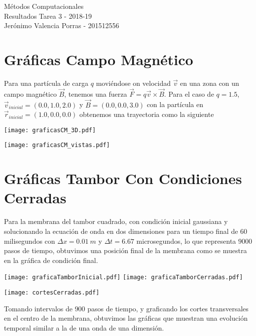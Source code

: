 \documentclass[12pt, letterpaper]{article}
\begin{document}
\begin{center}
{\Large Métodos Computacionales} \\
Resultados Tarea 3 - \textsc{2018-19}\\
Jer\'onimo Valencia Porras - 201512556\\
\end{center}


\noindent
\section{Gr\'aficas Campo Magn\'etico}

Para una partícula de carga $q$ moviéndose on velocidad $\vec{v}$ en una zona con un campo magnético $\vec{B}$, tenemos una fuerza $\vec{F} = q\vec{v}\times\vec{B}$. Para el caso de $q=1.5$, $\vec{v}_{inicial} = (0.0,1.0,2.0)$ y $\vec{B} = (0.0,0.0,3.0)$ con la partícula en $\vec{r}_{inicial} = (1.0,0.0,0.0)$ obtenemos una trayectoria como la siguiente

\begin{center}
\texttt{[image: graficasCM\_3D.pdf]} 
\end{center}

\begin{center}
\texttt{[image: graficasCM\_vistas.pdf]} 
\end{center}



\section{Gr\'aficas Tambor Con Condiciones Cerradas}


Para la membrana del tambor cuadrado, con condición inicial gaussiana y solucionando la ecuación de onda en dos dimensiones para un tiempo final de $60$ milisegundos con $\Delta x = 0.01 \ m$ y $\Delta t = 6.67$ microsegundos, lo que representa $9000$ pasos de tiempo, obtuvimos una posición final de la membrana como se muestra en la gráfica de condición final.


\begin{center}
\texttt{[image: graficaTamborInicial.pdf]}
\texttt{[image: graficaTamborCerradas.pdf]}  
\end{center}
\texttt{[image: cortesCerradas.pdf]}

Tomando intervalos de $900$ pasos de tiempo, y graficando los cortes transversales en el centro de la membrana, obtuvimos las gráficas que muestran una evolución temporal similar a la de una onda de una dimensión.
\end{document}

